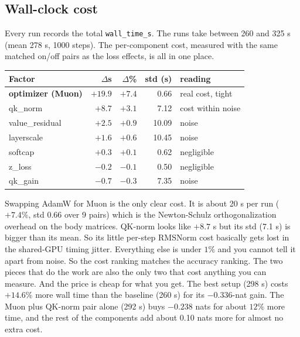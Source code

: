 \documentclass[11pt]{article}
\begin{document}
\subsection{Wall-clock cost}
\label{sec:cost}

Every run records the total \texttt{wall\_time\_s}. The runs take between 260 and
325 s (mean 278 s, 1000 steps). The per-component cost, measured with the same
matched on/off pairs as the loss effects, is all in one place.

\begin{table}[h]
\centering
\small
\begin{tabular}{@{}lRRRl@{}}
\toprule
\textbf{Factor} & \textbf{$\Delta$s} & \textbf{$\Delta$\%} & \textbf{std (s)} & \textbf{reading} \\
\midrule
\textbf{optimizer (Muon)} & $+19.9$ & $+7.4$ & 0.66 & real cost, tight \\
qk\_norm                  & $+8.7$  & $+3.1$ & 7.12 & cost within noise \\
value\_residual           & $+2.5$  & $+0.9$ & 10.09 & noise \\
layerscale                & $+1.6$  & $+0.6$ & 10.45 & noise \\
softcap                   & $+0.3$  & $+0.1$ & 0.62 & negligible \\
z\_loss                   & $-0.2$  & $-0.1$ & 0.50 & negligible \\
qk\_gain                  & $-0.7$  & $-0.3$ & 7.35 & noise \\
\bottomrule
\end{tabular}
\end{table}

Swapping AdamW for Muon is the only clear cost. It is about 20 s per run ($+7.4\%$,
std 0.66 over 9 pairs) which is the Newton-Schulz orthogonalization overhead on the
body matrices. QK-norm looks like $+8.7$ s but its std (7.1 s) is bigger than its
mean. So its little per-step RMSNorm cost basically gets lost in the shared-GPU
timing jitter. Everything else is under $1\%$ and you cannot tell it apart from
noise. So the cost ranking matches the accuracy ranking. The two pieces that do the
work are also the only two that cost anything you can measure. And the price is
cheap for what you get. The best setup (298 s) costs $+14.6\%$ more wall time than
the baseline (260 s) for its $-0.336$-nat gain. The Muon plus QK-norm pair alone
(292 s) buys $-0.238$ nats for about $12\%$ more time, and the rest of the
components add about 0.10 nats more for almost no extra cost.
\end{document}
